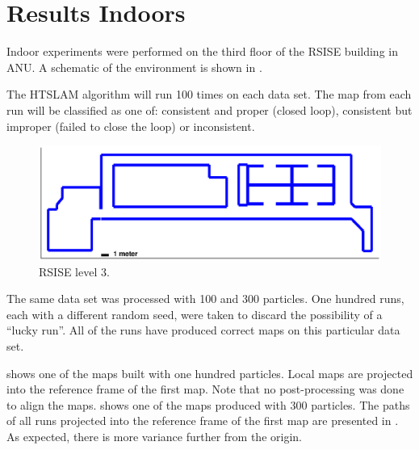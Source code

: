 \section {Results Indoors}

Indoor experiments were performed on the third floor of the RSISE
building in ANU. A schematic of the environment is shown in
.

The HTSLAM algorithm will run 100 times on each data set. The map from
each run will be classified as one of: consistent and proper (closed
loop), consistent but improper (failed to close the loop) or
inconsistent.

 
\begin{figure}[htbp]
  \centering
  \includegraphics[width=13cm]{Pics/rsise_level3_map}
  \caption{RSISE level 3.}
  \label{fig:rsise_level3_map}
\end{figure}

The same data set was processed with 100 and 300 particles. One
hundred runs, each with a different random seed, were taken to discard
the possibility of a ``lucky run''. All of the runs have produced
correct maps on this particular data set.

 shows one of the maps built with
one hundred particles. Local maps are projected into the reference frame
of the first map. Note that no post-processing was done to align the
maps.  shows one of the maps produced
with 300 particles. The paths of all runs projected into the reference
frame of the first map are presented in
. As expected, there is more variance
further from the origin.


